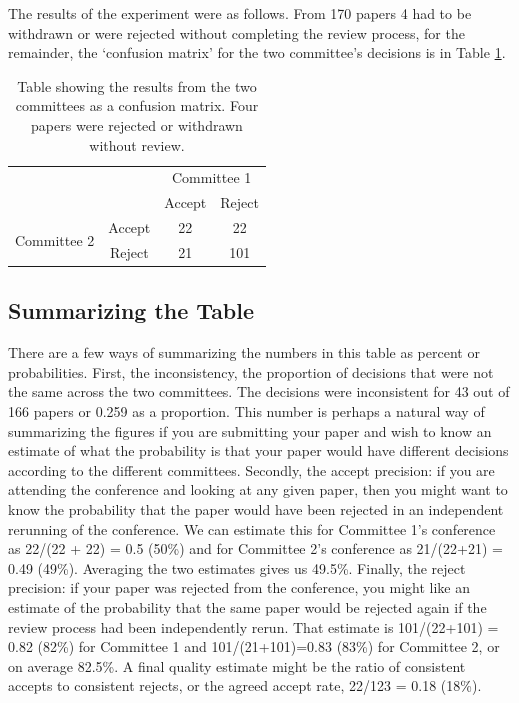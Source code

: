 \begin{flushright}
\end{flushright}

The results of the experiment were as follows. From 170 papers 4 had to
be withdrawn or were rejected without completing the review process, for
the remainder, the `confusion matrix' for the two committee's decisions
is in Table \ref{table-neurips-experiment-results}.

\begin{table}[htb]
\caption{Table showing the results from the two committees as a confusion matrix. Four papers were rejected or withdrawn without review.}
\label{table-neurips-experiment-results}


\begin{tabular}{lc|c|c|}
& & \multicolumn{2}{c}{Committee 1} \\
& & Accept & Reject \\
\multirow{2}{*}{Committee 2} & Accept & 22 & 22 \hline \\
& Reject & 21 & 101 
\end{tabular}
\end{table}

\hypertarget{summarizing-the-table}{%
\subsection{Summarizing the Table}\label{summarizing-the-table}}

There are a few ways of summarizing the numbers in this table as percent
or probabilities. First, the inconsistency, the proportion of decisions
that were not the same across the two committees. The decisions were
inconsistent for 43 out of 166 papers or 0.259 as a proportion. This
number is perhaps a natural way of summarizing the figures if you are
submitting your paper and wish to know an estimate of what the
probability is that your paper would have different decisions according
to the different committees. Secondly, the accept precision: if you are
attending the conference and looking at any given paper, then you might
want to know the probability that the paper would have been rejected in
an independent rerunning of the conference. We can estimate this for
Committee 1's conference as 22/(22 + 22) = 0.5 (50\%) and for Committee
2's conference as 21/(22+21) = 0.49 (49\%). Averaging the two estimates
gives us 49.5\%. Finally, the reject precision: if your paper was
rejected from the conference, you might like an estimate of the
probability that the same paper would be rejected again if the review
process had been independently rerun. That estimate is 101/(22+101) =
0.82 (82\%) for Committee 1 and 101/(21+101)=0.83 (83\%) for Committee
2, or on average 82.5\%. A final quality estimate might be the ratio of
consistent accepts to consistent rejects, or the agreed accept rate,
22/123 = 0.18 (18\%).

